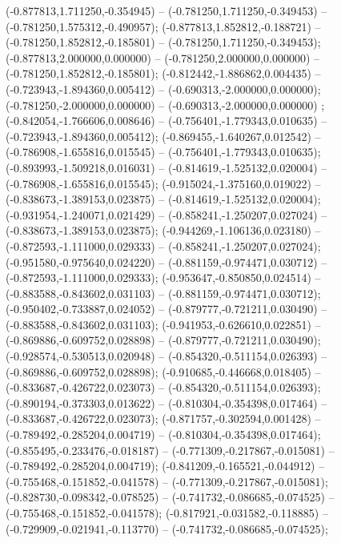  (-0.877813,1.711250,-0.354945) -- (-0.781250,1.711250,-0.349453) -- (-0.781250,1.575312,-0.490957);
 (-0.877813,1.852812,-0.188721) -- (-0.781250,1.852812,-0.185801) -- (-0.781250,1.711250,-0.349453);
 (-0.877813,2.000000,0.000000) -- (-0.781250,2.000000,0.000000) -- (-0.781250,1.852812,-0.185801);
 (-0.812442,-1.886862,0.004435) -- (-0.723943,-1.894360,0.005412) -- (-0.690313,-2.000000,0.000000);
 (-0.781250,-2.000000,0.000000) -- (-0.690313,-2.000000,0.000000) ;
 (-0.842054,-1.766606,0.008646) -- (-0.756401,-1.779343,0.010635) -- (-0.723943,-1.894360,0.005412);
 (-0.869455,-1.640267,0.012542) -- (-0.786908,-1.655816,0.015545) -- (-0.756401,-1.779343,0.010635);
 (-0.893993,-1.509218,0.016031) -- (-0.814619,-1.525132,0.020004) -- (-0.786908,-1.655816,0.015545);
 (-0.915024,-1.375160,0.019022) -- (-0.838673,-1.389153,0.023875) -- (-0.814619,-1.525132,0.020004);
 (-0.931954,-1.240071,0.021429) -- (-0.858241,-1.250207,0.027024) -- (-0.838673,-1.389153,0.023875);
 (-0.944269,-1.106136,0.023180) -- (-0.872593,-1.111000,0.029333) -- (-0.858241,-1.250207,0.027024);
 (-0.951580,-0.975640,0.024220) -- (-0.881159,-0.974471,0.030712) -- (-0.872593,-1.111000,0.029333);
 (-0.953647,-0.850850,0.024514) -- (-0.883588,-0.843602,0.031103) -- (-0.881159,-0.974471,0.030712);
 (-0.950402,-0.733887,0.024052) -- (-0.879777,-0.721211,0.030490) -- (-0.883588,-0.843602,0.031103);
 (-0.941953,-0.626610,0.022851) -- (-0.869886,-0.609752,0.028898) -- (-0.879777,-0.721211,0.030490);
 (-0.928574,-0.530513,0.020948) -- (-0.854320,-0.511154,0.026393) -- (-0.869886,-0.609752,0.028898);
 (-0.910685,-0.446668,0.018405) -- (-0.833687,-0.426722,0.023073) -- (-0.854320,-0.511154,0.026393);
 (-0.890194,-0.373303,0.013622) -- (-0.810304,-0.354398,0.017464) -- (-0.833687,-0.426722,0.023073);
 (-0.871757,-0.302594,0.001428) -- (-0.789492,-0.285204,0.004719) -- (-0.810304,-0.354398,0.017464);
 (-0.855495,-0.233476,-0.018187) -- (-0.771309,-0.217867,-0.015081) -- (-0.789492,-0.285204,0.004719);
 (-0.841209,-0.165521,-0.044912) -- (-0.755468,-0.151852,-0.041578) -- (-0.771309,-0.217867,-0.015081);
 (-0.828730,-0.098342,-0.078525) -- (-0.741732,-0.086685,-0.074525) -- (-0.755468,-0.151852,-0.041578);
 (-0.817921,-0.031582,-0.118885) -- (-0.729909,-0.021941,-0.113770) -- (-0.741732,-0.086685,-0.074525);
